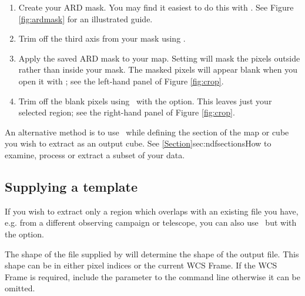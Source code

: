 \documentclass[11pt,oneside,chapters]{starlink}
\begin{document}
\begin{enumerate}[label=(\arabic*)]
\item Create your ARD mask. You may find it easiest to do this with
\gaia. See Figure \ref{fig:ardmask} for an illustrated guide.

\item Trim off the third axis from your mask using \ndfcopy.
\begin{terminalv}
\end{terminalv}

\item Apply the saved ARD mask to your map. Setting
 will mask the pixels outside rather than inside
your mask. The masked pixels will appear blank when you open it with
\gaia; see the left-hand panel of Figure \ref{fig:crop}.
\begin{terminalv}
\end{terminalv}

\item Trim off the blank pixels using \ndfcopy\ with the
 option. This leaves just your selected region; see the
right-hand panel of Figure \ref{fig:crop}.
\begin{terminalv}
\end{terminalv}
\end{enumerate}

An alternative method is to use \ndfcopy\ while defining the section
of the map or cube you wish to extract as an output cube. See
\cref{Section}{sec:ndfsections}{How to examine, process or extract a
subset of your data}.

\subsection{Supplying a template}

If you wish to extract only a region which overlaps with an existing
file you have, e.g. from a different observing campaign or telescope,
you can also use \ndfcopy\ but with the  option.
\begin{terminalv}
\end{terminalv}
The shape of the file supplied by  will determine the
shape of the output file. This shape can be in either pixel indices or
the current WCS Frame. If the WCS Frame is required, include the
parameter  to the command line otherwise it can be
omitted.
\end{document}
